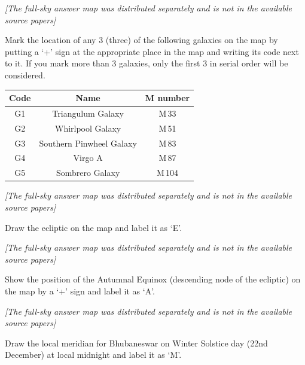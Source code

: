 \textit{[The full-sky answer map was distributed separately and is not in the available source papers]}

Mark the location of any 3 (three) of the following galaxies on the map by
putting a `+' sign at the appropriate place in the map and writing its code
next to it. If you mark more than 3 galaxies, only the first 3 in serial order
will be considered.

\begin{center}
\begin{tabular}{ccc}
Code & Name & M number \\
\hline
G1 & Triangulum Galaxy & M\,33 \\
G2 & Whirlpool Galaxy & M\,51 \\
G3 & Southern Pinwheel Galaxy & M\,83 \\
G4 & Virgo A & M\,87 \\
G5 & Sombrero Galaxy & M\,104 \\
\end{tabular}
\end{center}

\textit{[The full-sky answer map was distributed separately and is not in the available source papers]}

Draw the ecliptic on the map and label it as `E'.

\textit{[The full-sky answer map was distributed separately and is not in the available source papers]}

Show the position of the Autumnal Equinox (descending node of the ecliptic) on
the map by a `+' sign and label it as `A'.

\textit{[The full-sky answer map was distributed separately and is not in the available source papers]}

Draw the local meridian for Bhubaneswar on Winter Solstice day (22nd December)
at local midnight and label it as `M'.


